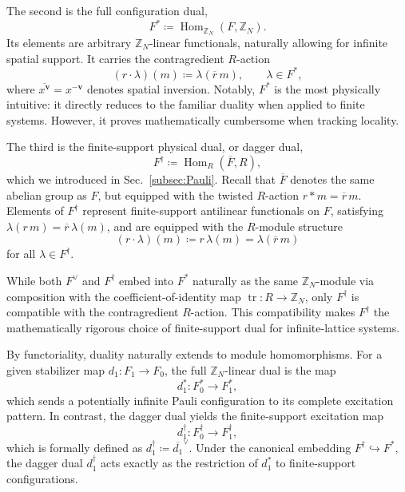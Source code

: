 \documentclass[aps,prx,english,superscriptaddress,twocolumn,tightenlines,showpacs,longbibliography,floatfix,amsfonts]{revtex4-2}
\theoremstyle{remark}
\theoremstyle{definition}
\begin{document}
The second is the full configuration dual,
\begin{equation}
	F^\ast
	\coloneqq
	\operatorname{Hom}_{\mathbb Z_N}(F,\mathbb Z_N).
	\label{eq:ZN-dual}
\end{equation}
Its elements are arbitrary $\mathbb Z_N$-linear functionals, naturally allowing for infinite spatial support. It carries the contragredient $R$-action
\begin{equation}
	(r\cdot \lambda)(m)
	\coloneqq
	\lambda(\overline r\,m),
	\qquad
	\lambda \in F^\ast,
\end{equation}
where $\overline{x^{\mathbf v}}=x^{-\mathbf v}$ denotes spatial inversion. Notably, $F^\ast$ is the most physically intuitive: it directly reduces to the familiar duality when applied to finite systems. However, it proves mathematically cumbersome when tracking locality.

The third is the finite-support physical dual, or dagger dual,
\begin{equation}
	F^\dagger
	\coloneqq
	\operatorname{Hom}_R(\overline F,R),
	\label{eq:dagger-dual}
\end{equation}
which we introduced in Sec.~\ref{subsec:Pauli}. Recall that $\overline F$ denotes the same abelian group as $F$, but equipped with the twisted $R$-action $r \ast m=\overline r\,m$. Elements of $F^\dagger$ represent finite-support antilinear functionals on $F$, satisfying $\lambda(r\,m)=\overline r\,\lambda(m)$, and are equipped with the $R$-module structure
\begin{equation}
	(r\cdot \lambda )(m) \coloneqq r\, \lambda (m) =
	\lambda (\overline{r}\,m)
\end{equation}
for all $\lambda \in F^\dagger$.

While both $F^\vee$ and $F^\dagger$ embed into $F^\ast$ naturally as the same $\mathbb{Z}_N$-module via composition with the coefficient-of-identity map $\operatorname{tr}:R\to\mathbb Z_N$, only $F^\dagger$ is compatible with the contragredient $R$-action. This compatibility makes $F^\dagger$ the mathematically rigorous choice of finite-support dual for infinite-lattice systems.

By functoriality, duality naturally extends to module homomorphisms. For a given stabilizer map $d_1:F_1\to F_0$, the full $\mathbb Z_N$-linear dual is the map
\begin{equation}
	d_1^\ast:F_0^\ast\to F_1^\ast,
\end{equation}
which sends a potentially infinite Pauli configuration to its complete excitation pattern. In contrast, the dagger dual yields the finite-support excitation map
\begin{equation}
	d_1^\dagger:F_0^\dagger\to F_1^\dagger,
\end{equation}
which is formally defined as $d_1^\dagger \coloneqq \overline{d_1}^\vee$. Under the canonical embedding $F^\dagger\hookrightarrow F^\ast$, the dagger dual $d_1^\dagger$ acts exactly as the restriction of $d_1^\ast$ to finite-support configurations.
\end{document}
